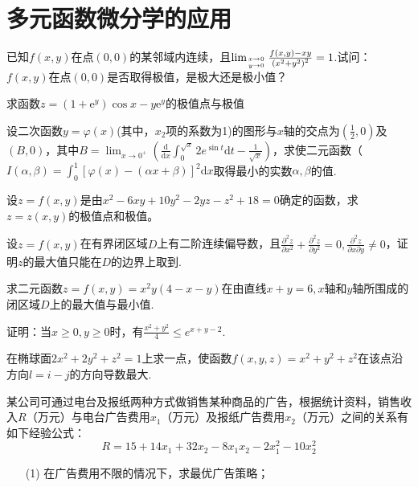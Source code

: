 \section{多元函数微分学的应用}
\begin{xiti}
	\item 	已知$f(x,y)$在点$(0,0)$的某邻域内连续，且$\lim _{x \rightarrow 0 \atop y \rightarrow 0} \frac{f(x, y)-x y}{\left(x^{2}+y^{2}\right)^{2}}=1$.试问：$f(x,y)$在点$(0,0)$是否取得极值，是极大还是极小值？
	\item 求函数$z=\left(1+\mathrm{e}^{y}\right) \cos x-y \mathrm{e}^{y}$的极值点与极值
	\item 设二次函数$y=\varphi(x)$(其中，$x_{2}$项的系数为1)的图形与$x$轴的交点为$\left(\frac{1}{2}, 0\right)$及$(B,0)$，其中$B=\lim _{x \rightarrow 0^{+}}\left(\frac{\mathrm{d}}{\mathrm{d} x} \int_{0}^{\sqrt{x}} 2 e^{\sin t} \mathrm{d} t-\frac{1}{\sqrt{x}}\right)$，求使二元函数（$I(\alpha, \beta)=\int_{0}^{1}[\varphi(x)-(\alpha x+\beta)]^{2} \mathrm{d} x$取得最小的实数$\alpha,\beta$的值.
	
	\item 设$z=f(x,y)$是由$x^{2}-6 x y+10 y^{2}-2 y z-z^{2}+18=0$确定的函数，求$z=z(x,y)$的极值点和极值。
	
	\item 设$z=f(x,y)$在有界闭区域$D$上有二阶连续偏导数，且$\frac{\partial^{2} z}{\partial x^{2}}+\frac{\partial^{2} z}{\partial y^{2}}=0, \frac{\partial^{2} z}{\partial x \partial y} \neq 0$，证明$z$的最大值只能在$D$的边界上取到.
	
	\item 求二元函数$z=f(x, y)=x^{2} y(4-x-y)$在由直线$x+y=6,x$轴和$y$轴所围成的闭区域$D$上的最大值与最小值.
	
	\item 证明：当$x\geq 0,y\geq 0$时，有$\frac{x^{2}+y^{2}}{4} \leqslant e^{x+y-2}$.
	
	\item 在椭球面$2 x^{2}+2 y^{2}+z^{2}=1$上求一点，使函数$f(x, y, z)=x^{2}+y^{2}+z^{2}$在该点沿方向$l=i-j$的方向导数最大.
	
	\item 某公司可通过电台及报纸两种方式做销售某种商品的广告，根据统计资料，销售收入$R$（万元）与电台广告费用$x_{1}$（万元）及报纸广告费用$x_{2}$（万元）之间的关系有如下经验公式：
	\[R=15+14 x_{1}+32 x_{2}-8 x_{1} x_{2}-2 x_{1}^{2}-10 x_{2}^{2}\]
	\begin{enumerate}
		\item [(1)]在广告费用不限的情况下，求最优广告策略；
		

\end{enumerate}
\end{xiti}
